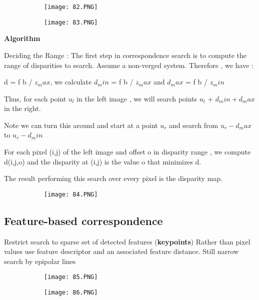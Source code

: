 \documentclass{article}
\begin{document}
\begin{figure}[ht!]
  \centering
  \begin{subfigure}[b]{0.4\linewidth}
    \texttt{[image: 82.PNG]}
  \end{subfigure}
  \begin{subfigure}[b]{0.4\textwidth}
         \centering
         \texttt{[image: 83.PNG]}
     \end{subfigure}
\end{figure}

\textbf{Algorithm}

Deciding the Range : The first step in correspondence search is to compute the range of disparities to search.
Assume a non-verged system. Therefore , we have : 

d = f b / $z_max$, we calculate $d_min$ = f b / $z_max$ and $d_max$ = f b / $z_min$

Thus, for each point $u_l$ in the left image , we will search points $u_l$ + $d_min + d_max$ in the right.

Note we can turn this around and start at a point $u_r$  and search from $u_r - d_max$ to $u_r - d_min$

For each pixel (i,j) of the left image and offset o in disparity range , we compute d(i,j,o) and the disparity at (i,j) is the value o that minimizes d.

The result performing this search over every pixel is the disparity map. 

\begin{figure}[ht!]
  \centering
  \begin{subfigure}[b]{0.4\linewidth}
    \texttt{[image: 84.PNG]}
  \end{subfigure}
\end{figure}

\subsection{Feature-based correspondence}

Restrict search to sparse set of detected features (\textbf{keypoints})
Rather than pixel values use feature descriptor and an associated feature distance.
Still narrow search by epipolar lines


\begin{figure}[ht!]
  \centering
  \begin{subfigure}[b]{0.4\linewidth}
    \texttt{[image: 85.PNG]}
  \end{subfigure}
  \begin{subfigure}[b]{0.4\textwidth}
         \centering
         \texttt{[image: 86.PNG]}
     \end{subfigure}
\end{figure}
\end{document}
